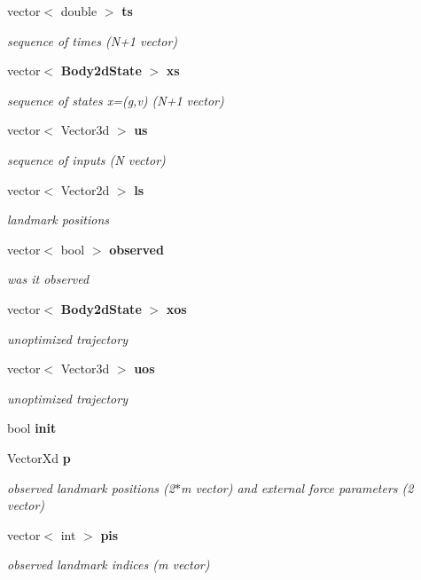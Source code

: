 \begin{DoxyCompactItemize}
vector$<$ double $>$ {\bf ts}
\begin{DoxyCompactList}\small\item\em sequence of times (\-N+1 vector) \end{DoxyCompactList}\item 
vector$<$ {\bf \-Body2d\-State} $>$ {\bf xs}
\begin{DoxyCompactList}\small\item\em sequence of states x=(g,v) (\-N+1 vector) \end{DoxyCompactList}\item 
vector$<$ \-Vector3d $>$ {\bf us}
\begin{DoxyCompactList}\small\item\em sequence of inputs (\-N vector) \end{DoxyCompactList}\item 
vector$<$ \-Vector2d $>$ {\bf ls}
\begin{DoxyCompactList}\small\item\em landmark positions \end{DoxyCompactList}\item 
vector$<$ bool $>$ {\bf observed}
\begin{DoxyCompactList}\small\item\em was it observed \end{DoxyCompactList}\item 
vector$<$ {\bf \-Body2d\-State} $>$ {\bf xos}
\begin{DoxyCompactList}\small\item\em unoptimized trajectory \end{DoxyCompactList}\item 
vector$<$ \-Vector3d $>$ {\bf uos}
\begin{DoxyCompactList}\small\item\em unoptimized trajectory \end{DoxyCompactList}\item 
bool {\bf init}
\item 
\-Vector\-Xd {\bf p}
\begin{DoxyCompactList}\small\item\em observed landmark positions (2$\ast$m vector) and external force parameters (2 vector) \end{DoxyCompactList}\item 
vector$<$ int $>$ {\bf pis}
\begin{DoxyCompactList}\small\item\em observed landmark indices (m vector) \end{DoxyCompactList}\item 

\end{DoxyCompactItemize}
